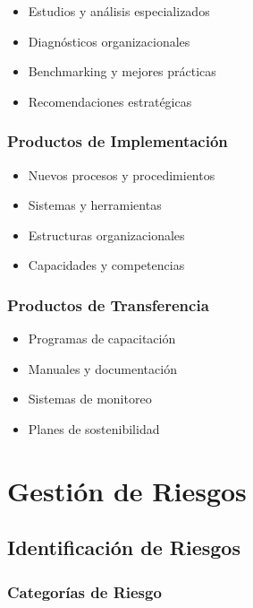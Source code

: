 \documentclass[12pt,letterpaper,oneside]{book}
\begin{document}
\begin{itemize}
\item Estudios y análisis especializados
\item Diagnósticos organizacionales
\item Benchmarking y mejores prácticas
\item Recomendaciones estratégicas
\end{itemize}

\subsubsection{Productos de Implementación}

\begin{itemize}
\item Nuevos procesos y procedimientos
\item Sistemas y herramientas
\item Estructuras organizacionales
\item Capacidades y competencias
\end{itemize}

\subsubsection{Productos de Transferencia}

\begin{itemize}
\item Programas de capacitación
\item Manuales y documentación
\item Sistemas de monitoreo
\item Planes de sostenibilidad
\end{itemize}

\section{Gestión de Riesgos}

\subsection{Identificación de Riesgos}

\subsubsection{Categorías de Riesgo}
\end{document}
